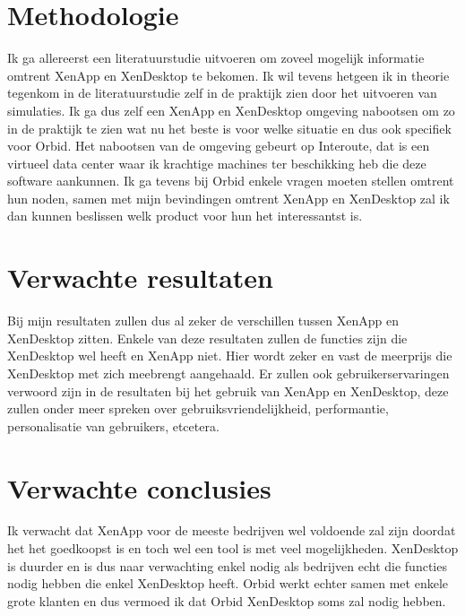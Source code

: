 \documentclass[fleqn,10pt]{voorstel}
\begin{document}
\section{Methodologie}
\label{sec:methodologie}

Ik ga allereerst een literatuurstudie uitvoeren om zoveel mogelijk informatie omtrent XenApp en XenDesktop te bekomen. Ik wil tevens hetgeen ik in theorie tegenkom in de literatuurstudie zelf in de praktijk zien door het uitvoeren van simulaties. Ik ga dus zelf een XenApp en XenDesktop omgeving nabootsen om zo in de praktijk te zien wat nu het beste is voor welke situatie en dus ook specifiek voor Orbid. Het nabootsen van de omgeving gebeurt op Interoute, dat is een virtueel data center waar ik krachtige machines ter beschikking heb die deze software aankunnen. Ik ga tevens bij Orbid enkele vragen moeten stellen omtrent hun noden, samen met mijn bevindingen omtrent XenApp en XenDesktop zal ik dan kunnen beslissen welk product voor hun het interessantst is.

\section{Verwachte resultaten}
\label{sec:verwachte_resultaten}

Bij mijn resultaten zullen dus al zeker de verschillen tussen XenApp en XenDesktop zitten. Enkele van deze resultaten zullen de functies zijn die XenDesktop wel heeft en XenApp niet. Hier wordt zeker en vast de meerprijs die XenDesktop met zich meebrengt aangehaald. Er zullen ook gebruikerservaringen verwoord zijn in de resultaten bij het gebruik van XenApp en XenDesktop, deze zullen onder meer spreken over gebruiksvriendelijkheid, performantie, personalisatie van gebruikers, etcetera.

\section{Verwachte conclusies}
\label{sec:verwachte_conclusies}

Ik verwacht dat XenApp voor de meeste bedrijven wel voldoende zal zijn doordat het het goedkoopst is en toch wel een tool is met veel mogelijkheden. XenDesktop is duurder en is dus naar verwachting enkel nodig als bedrijven echt die functies nodig hebben die enkel XenDesktop heeft. Orbid werkt echter samen met enkele grote klanten en dus vermoed ik dat Orbid XenDesktop soms zal nodig hebben.


\printbibliography[heading=bibintoc]
\end{document}
